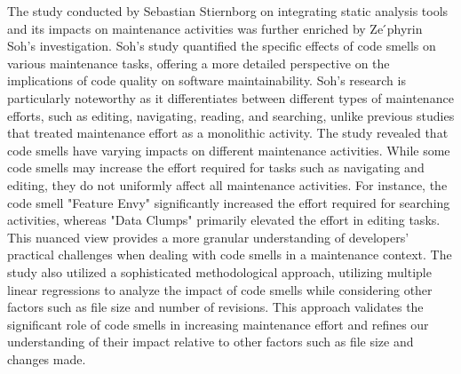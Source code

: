 The study conducted by Sebastian Stiernborg \cite{stiernborg2019automated} on integrating static analysis tools and its impacts on maintenance activities was further enriched by Ze ́phyrin Soh's \cite{soh2016code} investigation. Soh's study quantified the specific effects of code smells on various maintenance tasks, offering a more detailed perspective on the implications of code quality on software maintainability. Soh's research is particularly noteworthy as it differentiates between different types of maintenance efforts, such as editing, navigating, reading, and searching, unlike previous studies that treated maintenance effort as a monolithic activity. The study revealed that code smells have varying impacts on different maintenance activities. While some code smells may increase the effort required for tasks such as navigating and editing, they do not uniformly affect all maintenance activities. For instance, the code smell "Feature Envy" significantly increased the effort required for searching activities, whereas "Data Clumps" primarily elevated the effort in editing tasks. This nuanced view provides a more granular understanding of developers' practical challenges when dealing with code smells in a maintenance context. The study also utilized a sophisticated methodological approach, utilizing multiple linear regressions to analyze the impact of code smells while considering other factors such as file size and number of revisions. This approach validates the significant role of code smells in increasing maintenance effort and refines our understanding of their impact relative to other factors such as file size and changes made.
\par
